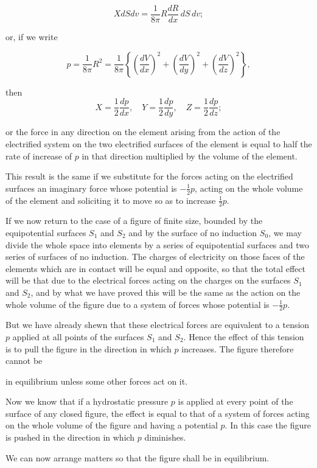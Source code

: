\documentclass[11pt,a4paper]{article}
\begin{document}
\[
XdSdv=\frac{1}{8\pi}R\frac{dR}{dx}\,dS\,dv;
\]

or, if we write

\[
p=\frac{1}{8\pi}R^2=\frac{1}{8\pi}\left\{
\left(\frac{dV}{dx}\right)^2+
\left(\frac{dV}{dy}\right)^2+
\left(\frac{dV}{dz}\right)^2\right\},
\]

then 
\[
X=\frac{1}{2}\frac{dp}{dx},\quad
Y=\frac{1}{2}\frac{dp}{dy},\quad
Z=\frac{1}{2}\frac{dp}{dz};
\]

or the force in any direction on the element arising from the action of the electrified system on the two electrified surfaces of the element is equal to half the rate of increase of $p$ in that direction multiplied by the volume of the element.

This result is the same if we substitute for the forces acting on the electrified surfaces an imaginary force whose potential is $-\frac{1}{2}p$, acting on the whole volume of the element and soliciting it to move so as to increase $\frac{1}{2}p$.

If we now return to the case of a figure of finite size, bounded by the equipotential surfaces $S_1$ and $S_2$ and by the surface of no induction $S_0$, we may divide the whole space into elements by a series of equipotential surfaces and two series of surfaces of no induction. The charges of electricity on those faces of the elements which are in contact will be equal and opposite, so that the total effect will be that due to the electrical forces acting on the charges on the surfaces $S_1$ and $S_2$, and by what we have proved this will be the same as the action on the whole volume of the figure due to a system of forces whose potential is $-\frac{1}{2}p$.

But we have already shewn that these electrical forces are equivalent to a tension $p$ applied at all points of the surfaces $S_1$ and $S_2$. Hence the effect of this tension is to pull the figure in the direction in which $p$ increases. The figure therefore cannot be

in equilibrium unless some other forces act on it.

Now we know that if a hydrostatic pressure $p$ is applied at every point of the surface of any closed figure, the effect is equal to that of a system of forces acting on the whole volume of the figure and having a potential $p$. In this case the figure is pushed in the direction in which $p$ diminishes.

We can now arrange matters so that the figure shall be in equilibrium.
\end{document}
